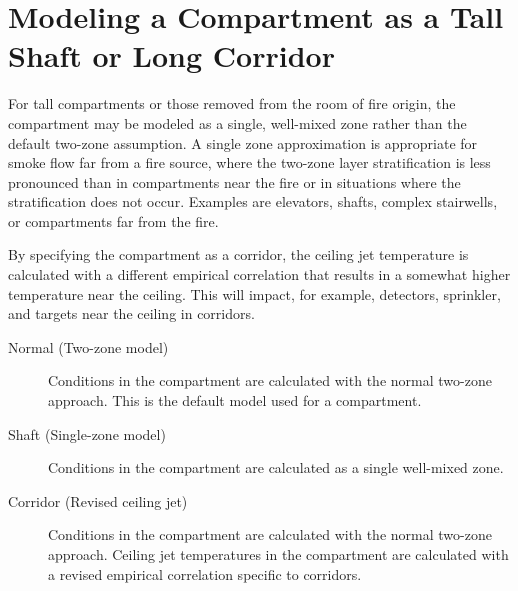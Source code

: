 



\section{Modeling a Compartment as a Tall Shaft or Long Corridor}
\label{info:COMP3}
For tall compartments or those removed from the room of fire origin, the compartment may be modeled as a single, well-mixed zone rather than the default two-zone assumption. A single zone approximation is appropriate for smoke flow far from a fire source, where the two-zone layer stratification is less pronounced than in compartments near the fire or in situations where the stratification does not occur. Examples are elevators, shafts, complex stairwells, or compartments far from the fire.

By specifying the compartment as a corridor, the ceiling jet temperature is calculated with a different empirical correlation that results in a somewhat higher temperature near the ceiling.  This will impact, for example, detectors, sprinkler, and targets near the ceiling in corridors.

\begin{description}
\item[Normal (Two-zone model)] Conditions in the compartment are calculated with the normal two-zone approach. This is the default model used for a compartment.

\item[Shaft (Single-zone model)] Conditions in the compartment are calculated as a single well-mixed zone.

\item[Corridor (Revised ceiling jet)] Conditions in the compartment are calculated with the normal two-zone approach. Ceiling jet temperatures in the compartment are calculated with a revised empirical correlation specific to corridors.
\end{description}




